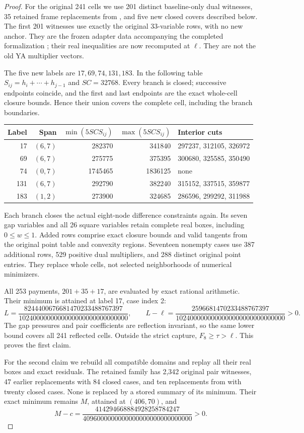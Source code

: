 \documentclass[11pt]{article}
\begin{document}
\begin{proof}
For the original 241 cells we use 201 distinct baseline-only dual
witnesses, 35 retained frame replacements from \cite{Joint}, and
five new closed covers described below. The first 201 witnesses
use exactly the original 33-variable rows, with no new anchor.
They are the frozen adapter data accompanying the completed
formalization \cite{Formal}; their real inequalities are now
recomputed at $\ell$. They are not the old YA multiplier vectors.

The five new labels are $17,69,74,131,183$. In the following table
$S_{ij}=h_i+\cdots+h_{j-1}$ and $SC=32768$. Every branch is closed;
successive endpoints coincide, and the first and last endpoints
are the exact whole-cell closure bounds. Hence their union covers
the complete cell, including the branch boundaries.
\begin{center}\small
\begin{tabular}{rrrrl}
\toprule
Label & Span & $\min(5SC S_{ij})$ & $\max(5SC S_{ij})$ & Interior cuts\\
\midrule
17  & $(6,7)$ & 282370  & 341840  & 297237, 312105, 326972\\
69  & $(6,7)$ & 275775  & 375395  & 300680, 325585, 350490\\
74  & $(0,7)$ & 1745465 & 1836125 & none\\
131 & $(6,7)$ & 292790  & 382240  & 315152, 337515, 359877\\
183 & $(1,2)$ & 273900  & 324685  & 286596, 299292, 311988\\
\bottomrule
\end{tabular}
\end{center}
Each branch closes the actual eight-node difference constraints
again. Its seven gap variables and all 26 square variables retain
complete real boxes, including $0\le w\le1$. Added rows comprise
exact closure bounds and valid tangents from the original point
table and convexity regions. Seventeen nonempty cases use 387
additional rows, 529 positive dual multipliers, and 288 distinct
original point entries. They replace whole cells, not selected
neighborhoods of numerical minimizers.

All 253 payments, $201+35+17$, are evaluated by exact rational
arithmetic. Their minimum is attained at label 17, case index 2:
\[
 L=\frac{8244400676681470233488767397}
          {1024000000000000000000000000000},\qquad
 L-\ell=
 \frac{2596681470233488767397}
      {1024000000000000000000000000000}>0.
\]
The gap pressures and pair coefficients are reflection invariant,
so the same lower bound covers all 241 reflected cells. Outside
the strict capture, $F_8\ge\tau>\ell$. This proves the first claim.

For the second claim we rebuild all compatible domains and replay
all their real boxes and exact residuals. The retained family has
2,342 original pair witnesses, 47 earlier replacements with 84
closed cases, and ten replacements from \cite{Joint} with twenty
closed cases. None is replaced by a stored summary of its minimum.
Their exact minimum remains $M$, attained at $(406,70)$, and
\[
 M-c=\frac{414294668884928258784247}
             {4096000000000000000000000000000}>0.
\]
\end{proof}
\end{document}
